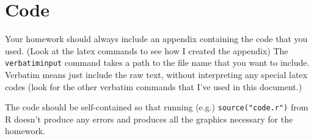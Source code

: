 \documentclass[oneside]{article}
\begin{document}
\newpage
\appendix
\section{Code}

Your homework should always include an appendix containing the code that you used.  (Look at the latex commands to see how I created the appendix) The \verb|verbatiminput| command takes a path to the file name that you want to include.  Verbatim means just include the raw text, without interpreting any special latex codes (look for the other verbatim commands that I've used in this document.)

The code should be self-contained so that running (e.g.) \verb|source("code.r")| from R doesn't produce any errors and produces all the graphics necessary for the homework.


\end{document}
